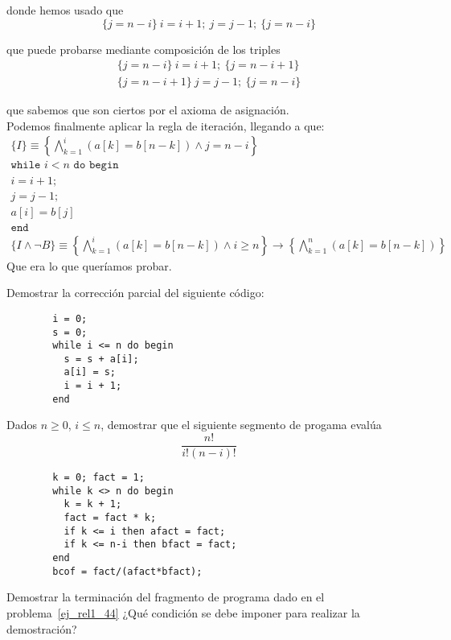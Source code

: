 \begin{ejercicio}
    donde hemos usado que
    \begin{equation*}
        \{j = n-i\}\ i=i+1;\ j=j-1;\ \{j = n-i\}
    \end{equation*}

    que puede probarse mediante composición de los triples
    \begin{gather*}
        \{j=n-i\}\ i=i+1;\ \{j=n-i+1\} \\
        \{j=n-i+1\}\ j=j-1;\ \{j=n-i\}
    \end{gather*}

    que sabemos que son ciertos por el axioma de asignación. \\

    Podemos finalmente aplicar la regla de iteración, llegando a que:
    \begin{gather*}
        \{I\} \equiv \left\{\bigwedge_{k=1}^{i}(a[k] = b[n-k]) \land j = n-i\right\} \\
        \texttt{while\ } i < n \texttt{\ do\ begin} \\
        i = i + 1; \\
        j = j - 1; \\
        a[i] = b[j] \\
        \texttt{end} \\
        \{I \land \lnot B\} \equiv \left\{\bigwedge_{k=1}^{i}(a[k] = b[n-k]) \land i\geq n\right\} \rightarrow \left\{\bigwedge_{k=1}^{n}(a[k] = b[n-k]) \right\}
    \end{gather*}
    Que era lo que queríamos probar.
\end{ejercicio}

\begin{ejercicio}
    Demostrar la corrección parcial del siguiente código:
    \begin{verbatim}
        i = 0;
        s = 0;
        while i <= n do begin
          s = s + a[i];
          a[i] = s;
          i = i + 1;
        end
    \end{verbatim}
\end{ejercicio}

\begin{ejercicio}
    Dados $n\geq 0$, $i\leq n$, demostrar que el siguiente segmento de progama evalúa
    \begin{equation*}
        \dfrac{n!}{i!(n-i)!}
    \end{equation*}
    \begin{verbatim}
        k = 0; fact = 1;
        while k <> n do begin
          k = k + 1;
          fact = fact * k;
          if k <= i then afact = fact;
          if k <= n-i then bfact = fact;
        end
        bcof = fact/(afact*bfact);
    \end{verbatim}
\end{ejercicio}

\begin{ejercicio}
    Demostrar la terminación del fragmento de programa dado en el problema~\ref{ej_rel1_44} ¿Qué condición se debe imponer para realizar la demostración?
\end{ejercicio}
